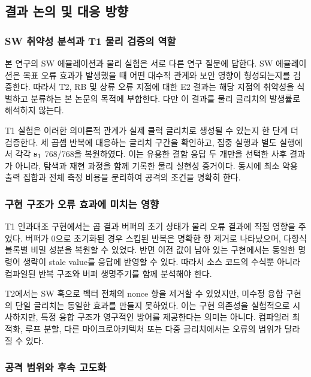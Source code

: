 \subsection{결과 논의 및 대응 방향}
\label{sec:discussion}

\subsubsection{SW 취약성 분석과 T1 물리 검증의 역할}

본 연구의 SW 에뮬레이션과 물리 실험은 서로 다른 연구 질문에 답한다.
SW 에뮬레이션은 목표 오류 효과가 발생했을 때 어떤 대수적 관계와
보안 영향이 형성되는지를 검증한다. 따라서 T2, RB 및 상류 오류
지점에 대한 E2 결과는 해당 지점의 취약성을 식별하고 분류하는 본
논문의 목적에 부합한다. 다만 이 결과를 물리 글리치의 발생률로
해석하지 않는다.

T1 실험은 이러한 의미론적 관계가 실제 클럭 글리치로 생성될 수 있는지
한 단계 더 검증한다. 세 곱셈 반복에 대응하는 글리치 구간을 확인하고,
집중 실행과 별도 실행에서 각각 $\mathbf{s}_1$ 768/768을 복원하였다.
이는 유용한 결함 응답 두 개만을 선택한 사후 결과가 아니라, 탐색과
재현 과정을 함께 기록한 물리 실현성 증거이다. 동시에 최소 악용 출력
집합과 전체 측정 비용을 분리하여 공격의 조건을 명확히 한다.

\subsubsection{구현 구조가 오류 효과에 미치는 영향}

T1 인과대조 구현에서는 곱 결과 버퍼의 초기 상태가 물리 오류 결과에
직접 영향을 주었다. 버퍼가 0으로 초기화된 경우 스킵된 반복은 명확한
항 제거로 나타났으며, 다항식 블록별 비밀 성분을 복원할 수 있었다.
반면 이전 값이 남아 있는 구현에서는 동일한 명령어 생략이 stale value를
응답에 반영할 수 있다. 따라서 소스 코드의 수식뿐 아니라 컴파일된
반복 구조와 버퍼 생명주기를 함께 분석해야 한다.

T2에서는 SW 훅으로 벡터 전체의 nonce 항을 제거할 수 있었지만,
미수정 융합 구현의 단일 글리치는 동일한 효과를 만들지 못하였다.
이는 구현 의존성을 실험적으로 시사하지만, 특정 융합 구조가 영구적인
방어를 제공한다는 의미는 아니다. 컴파일러 최적화, 루프 분할, 다른
마이크로아키텍처 또는 다중 글리치에서는 오류의 범위가 달라질 수 있다.

\subsubsection{공격 범위와 후속 고도화}

